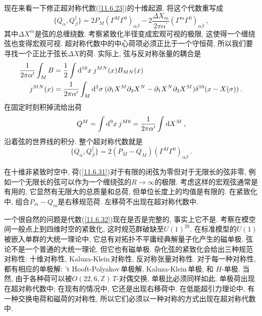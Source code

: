 现在来看一下修正超对称代数(\ref{11.6.23})的十维起源. 将这个代数重写成
\begin{equation}
    \{Q_{\alpha},Q^{\dag}_{\beta}\}=2P_{M}(\Gamma^{M}\Gamma^{0})_{\alpha\beta}-2\frac{\Delta X_{m}}{2\pi\alpha^{\prime}}(\Gamma^{m}\Gamma^{0})_{\alpha\beta}\:,\label{11.6.29}
\end{equation}
其中$ \Delta X^{m} $是弦的总缠绕数. 考察紧致化半径变成宏观可视的极限, 这使得一个缠绕弦也变得宏观可视. 超对称代数中的中心荷项必须正比于一个守恒荷, 所以我们要寻找一个正比于弦长$ \Delta X $的荷. 实际上, 弦与反对称张量的耦合是
\begin{subequations}
    \begin{align}
        \frac{1}{2\pi\alpha^{\prime}}\int_{M} B &=\frac{1}{2}\int \mathrm{d}^{10}x\:j^{MN}(x)B_{MN}(x) \label{11.6.30a} \\
        j^{MN}(x) &= \frac{1}{2\pi\alpha^{\prime}} \int_{M}\mathrm{d}^{2}\sigma\: (\partial_{1}X^{M}\partial_{2}X^{N}-\partial_{1}X^{N}\partial_{2}X^{M})\delta^{10}(x-X(\sigma))\:.\label{11.6.30b}
    \end{align}
\end{subequations}
在固定时刻积掉流给出荷
\begin{equation}
    Q^{M} = \int\mathrm{d}^{9}x\:j^{M0}=\frac{1}{2\pi\alpha^{\prime}}\int\mathrm{d} X^{M} \:, \label{11.6.31}
\end{equation}
沿着弦的世界线的积分. 整个超对称代数就是
\begin{equation}
    \{Q_{\alpha},Q^{\dag}_{\beta}\}=2(P_{M}-Q_{M})(\Gamma^{M}\Gamma^{0})_{\alpha\beta}\:. \label{11.6.32}
\end{equation}

在十维非紧致时空中, 荷(\ref{11.6.31})对于有限的闭弦为零但对于无限长的弦非零, 例如一个无限长的弦可以作为一个缠绕弦的$ R\to\infty $的极限. 考虑这样的宏观弦通常是有用的, 它显然有无限大的总质量和总荷, 但单位长度上的均值是有限的. 在紧致化中, 组合$ P_{m}-Q_{m} $是右移规范荷. 左移荷不出现在超对称代数中.

一个很自然的问题是代数(\ref{11.6.32})现在是否是完整的, 事实上它不是. 考察在模空间一般点上到四维时空的紧致化, 这时规范群破缺至$ U(1)^{28}$. 在标准模型的$ U(1) $被嵌入单群的大统一理论中, 它总有对拓扑不平庸经典解量子化产生的磁单极. 弦论不是一个普通的大统一理论, 但它也有磁单极. 杂化弦的紧致化会给出三种规范对称性: 十维对称性, Kaluza-Klein\,对称性, 反对称张量对称性. 对于每一种对称性, 都有相应的单极解: 't Hooft-Polyakov\,单极解, Kaluza-Klein\,单极, 和 $H$-单极. 当然, 由于各种荷可以被$ O(22,6,\mathds{Z})\,T $-对偶交换, 单极比必须同样如此. 单极荷出现在超对称代数中; 在现有的情况中, 它还是出现右移荷中. 在低能超引力理论中, 有一种交换电荷和磁荷的对称性, 所以它们必须以一种对称的方式出现在超对称代数中.  
